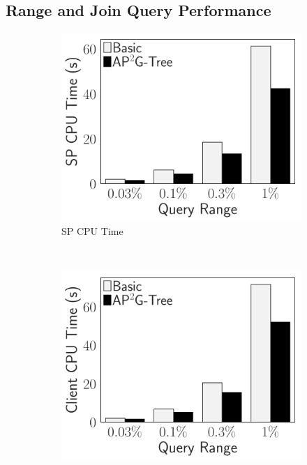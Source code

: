 \subsection{Range and Join Query Performance}

\begin{figure}[t]
    \centering
    \begin{subfigure}{.33\linewidth}
        \includegraphics[width=\linewidth]{exp-figs/access-control/range_sp.pdf}
        \caption{SP CPU Time}
    \end{subfigure}~%
    \begin{subfigure}{.33\linewidth}
        \includegraphics[width=\linewidth]{exp-figs/access-control/range_user.pdf}

\end{subfigure}
\end{figure}
